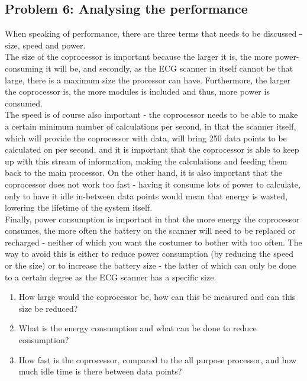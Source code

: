 \documentclass[12pt,a4paper]{article}
\begin{document}
\subsection{Problem 6: Analysing the performance}
When speaking of performance, there are three terms that needs to be discussed - size, speed and power. \\
The size of the coprocessor is important because the larger it is, the more power-consuming it will be, and secondly, as the ECG scanner in itself cannot be that large, there is a maximum size the processor can have. Furthermore, the larger the coprocessor is, the more modules is included and thus, more power is consumed.\\
The speed is of course also important - the coprocessor needs to be able to make a certain minimum number of calculations per second, in that the scanner itself, which will provide the coprocessor with data, will bring 250 data points to be calculated on per second, and it is important that the coprocessor is able to keep up with this stream of information, making the calculations and feeding them back to the main processor. On the other hand, it is also important that the coprocessor does not work too fast - having it consume lots of power to calculate, only to have it idle in-between data points would mean that energy is wasted, lowering the lifetime of the system itself.\\
Finally, power consumption is important in that the more energy the coprocessor consumes, the more often the battery on the scanner will need to be replaced or recharged - neither of which you want the costumer to bother with too often. The way to avoid this is either to reduce power consumption (by reducing the speed or the size) or to increase the battery size - the latter of which can only be done to a certain degree as the ECG scanner has a specific size.\\
\begin{enumerate}
\item How large would the coprocessor be, how can this be measured and can this size be reduced?
\item What is the energy consumption and what can be done to reduce consumption?
\item How fast is the coprocessor, compared to the all purpose processor, and how much idle time is there between data points? 
\end{enumerate}
\end{document}

